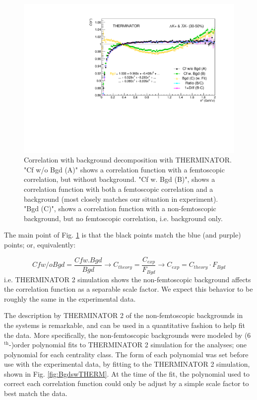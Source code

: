 \documentclass[/home/jesse/Analysis/FemtoAnalysis/AnalysisNotes/AnalysisNoteJBuxton.tex]{subfiles}
\begin{document}
\begin{figure}[h]
  \centering
  \includegraphics[width=\textwidth]{5_Fitting/Figures/CompareBgds_Full_LamKchPwConj_3050.pdf}
  \caption[Correlation with background decomposition (THERM)]{Correlation with background decomposition with THERMINATOR.  "Cf w/o Bgd (A)" shows a correlation function with a femtoscopic correlation, but without background.  "Cf w. Bgd (B)", shows a correlation function with both a femtoscopic correlation and a background (most closely matches our situation in experiment).  "Bgd (C)", shows a correlation function with a non-femtoscopic background, but no femtoscopic correlation, i.e. background only.}
  \label{fig:THERMCfBgdDecomposition}
\end{figure}


The main point of Fig. \ref{fig:THERMCfBgdDecomposition} is that the black points match the blue (and purple) points; or, equivalently:

\begin{equation}
  Cf w/o Bgd = \dfrac{Cf w. Bgd}{Bgd} \to C_{theory} = \dfrac{C_{exp}}{F_{Bgd}} \to C_{exp} = C_{theory}\cdot F_{Bgd}
  \label{eq:BgdDecomp}
\end{equation}
i.e. THERMINATOR 2 simulation shows the non-femtoscopic background affects the correlation function as a separable scale factor.  
We expect this behavior to be roughly the same in the experimental data.

The description by THERMINATOR 2 of the non-femtoscopic backgrounds in the \LamKpm systems is remarkable, and can be used in a quantitative fashion to help fit the data.
More specifically, the non-femtoscopic backgrounds were modeled by (6$^{\mathrm{th}}$-)order polynomial fits to THERMINATOR 2 simulation for the \LamKpm analyses; one polynomial for each centrality class.
The form of each polynomial was set before use with the experimental data, by fitting to the THERMINATOR 2 simulation, shown in Fig. \ref{fig:BgdswTHERM}.
At the time of the fit, the polynomial used to correct each correlation function could only be adjust by a simple scale factor to best match the data.
\end{document}
